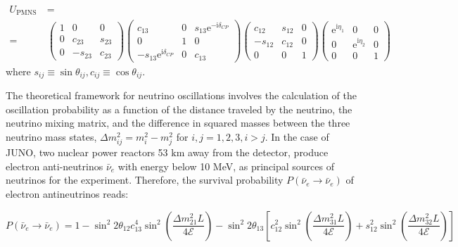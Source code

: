 \begin{equation*} 
	\begin{split}
			U_{\text {PMNS }}&=\\
		=&\left(\begin{array}{ccc}
			1 & 0 & 0 \\
			0 & c_{23} & s_{23} \\
			0 & -s_{23} & c_{23}
		\end{array}\right) \left(\begin{array}{ccc}
			c_{13} & 0 & s_{13} \mathrm{e}^{-\mathrm{i} \delta_{C P}} \\
			0 & 1 & 0 \\
			-s_{13} \mathrm{e}^{\mathrm{i} \delta_{C P}} & 0 & c_{13}
		\end{array}\right) 
		\left(\begin{array}{ccc}
			c_{12} & s_{12} & 0 \\
			-s_{12} & c_{12} & 0 \\
			0 & 0 & 1
		\end{array}\right)\left(\begin{array}{ccc}
			\mathrm{e}^{\mathrm{i} \eta_1} & 0 & 0 \\
			0 & \mathrm{e}^{\mathrm{i} \eta_2} & 0 \\
			0 & 0 & 1
		\end{array}\right)
	\end{split}
\end{equation*}
where $s_{i j} \equiv \sin \theta_{i j}, c_{i j} \equiv \cos \theta_{i j}$.

The theoretical framework for neutrino oscillations involves the calculation of the oscillation probability as a function of the distance traveled by the neutrino, the neutrino mixing matrix, and the difference in squared masses between the three neutrino mass states, $\Delta m_{ij}^2 = m^2_i - m^2_j$ for $i,j = 1,2,3, i>j$. In the case of JUNO, two nuclear power reactors 53 $\unit{\kilo\meter}$ away from the detector, produce electron anti-neutrinos $\bar{\nu}_e$ with energy below 10 MeV, as principal sources of neutrinos for the experiment. Therefore, the survival probability $P\left(\bar{\nu}_e \rightarrow \bar{\nu}_e\right)$ of electron antineutrinos reads:

\begin{equation*}
	P\left(\bar{\nu}_e \rightarrow \bar{\nu}_e\right)=1-\sin ^2 2 \theta_{12} c_{13}^4 \sin ^2\left(\frac{\Delta m_{21}^2 L}{4 \mathcal{E}}\right)-\sin ^2 2 \theta_{13}\left[c_{12}^2 \sin ^2\left(\frac{\Delta m_{31}^2 L}{4 \mathcal{E}}\right)+s_{12}^2 \sin ^2\left(\frac{\Delta m_{32}^2 L}{4 \mathcal{E}}\right)\right]
\end{equation*}

